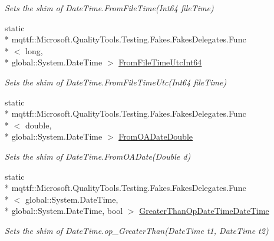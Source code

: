 \begin{DoxyCompactItemize}
\begin{DoxyCompactList}\small\item\em Sets the shim of Date\-Time.\-From\-File\-Time(\-Int64 file\-Time)\end{DoxyCompactList}\item 
static \\*
mqttf\-::\-Microsoft.\-Quality\-Tools.\-Testing.\-Fakes.\-Fakes\-Delegates.\-Func\\*
$<$ long, \\*
global\-::\-System.\-Date\-Time $>$ \hyperlink{class_system_1_1_fakes_1_1_shim_date_time_a88986853c4093d968bb9545d7433ae80}{From\-File\-Time\-Utc\-Int64}
\begin{DoxyCompactList}\small\item\em Sets the shim of Date\-Time.\-From\-File\-Time\-Utc(\-Int64 file\-Time)\end{DoxyCompactList}\item 
static \\*
mqttf\-::\-Microsoft.\-Quality\-Tools.\-Testing.\-Fakes.\-Fakes\-Delegates.\-Func\\*
$<$ double, \\*
global\-::\-System.\-Date\-Time $>$ \hyperlink{class_system_1_1_fakes_1_1_shim_date_time_aa0f5481d14897b906cef5ac695284e16}{From\-O\-A\-Date\-Double}
\begin{DoxyCompactList}\small\item\em Sets the shim of Date\-Time.\-From\-O\-A\-Date(\-Double d)\end{DoxyCompactList}\item 
static \\*
mqttf\-::\-Microsoft.\-Quality\-Tools.\-Testing.\-Fakes.\-Fakes\-Delegates.\-Func\\*
$<$ global\-::\-System.\-Date\-Time, \\*
global\-::\-System.\-Date\-Time, bool $>$ \hyperlink{class_system_1_1_fakes_1_1_shim_date_time_a4bf735cd94e2f99ee9f7b23ed5e4bb1a}{Greater\-Than\-Op\-Date\-Time\-Date\-Time}
\begin{DoxyCompactList}\small\item\em Sets the shim of Date\-Time.\-op\-\_\-\-Greater\-Than(\-Date\-Time t1, Date\-Time t2)\end{DoxyCompactList}\item 

\end{DoxyCompactItemize}

